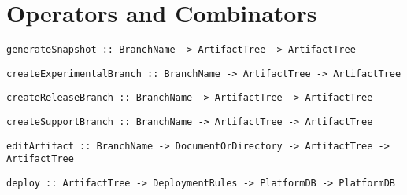 \documentclass[11pt]{article}
\newcommand{\RevisionNeeded}{\bigskip\noindent\fbox{
\textbf{Be prepared to revise this section \emph{many} times!}}}
\newcommand{\prog}[1]{{\small\texttt{#1}}}
\begin{document}



\section{Operators and Combinators}
\label{sec:comb}

%

\begin{lstlisting}[style=Haskell]
generateSnapshot :: BranchName -> ArtifactTree -> ArtifactTree
\end{lstlisting}
\begin{lstlisting}[style=Haskell]
createExperimentalBranch :: BranchName -> ArtifactTree -> ArtifactTree
\end{lstlisting}
\begin{lstlisting}[style=Haskell]
createReleaseBranch :: BranchName -> ArtifactTree -> ArtifactTree
\end{lstlisting}
\begin{lstlisting}[style=Haskell]
createSupportBranch :: BranchName -> ArtifactTree -> ArtifactTree
\end{lstlisting}
\begin{lstlisting}[style=Haskell]
editArtifact :: BranchName -> DocumentOrDirectory -> ArtifactTree -> ArtifactTree
\end{lstlisting}
\begin{lstlisting}[style=Haskell]
deploy :: ArtifactTree -> DeploymentRules -> PlatformDB -> PlatformDB
\end{lstlisting}

%

\end{document}
